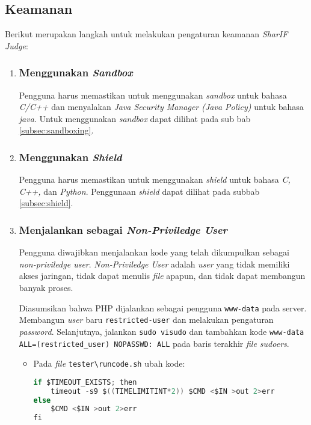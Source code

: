 \subsection{Keamanan}
Berikut merupakan langkah untuk melakukan pengaturan keamanan \textit{SharIF Judge}:
\begin{enumerate}
\item \subsubsection{Menggunakan \textit{Sandbox}}
Pengguna harus memastikan untuk menggunakan \textit{sandbox} untuk bahasa \textit{C/C++} dan menyalakan \textit{Java Security Manager (Java Policy)} untuk bahasa \textit{java}. Untuk menggunakan \textit{sandbox} dapat dilihat pada sub bab \ref{subsec:sandboxing}.

\item \subsubsection{Menggunakan \textit{Shield}}
Pengguna harus memastikan untuk menggunakan \textit{shield} untuk bahasa \textit{C, C++,} dan \textit{Python}. Penggunaan \textit{shield} dapat dilihat pada subbab \ref{subsec:shield}.

\item \subsubsection{Menjalankan sebagai \textit{Non-Priviledge User}}
Pengguna diwajibkan menjalankan kode yang telah dikumpulkan sebagai \textit{non-priviledge user}. \textit{Non-Priviledge User} adalah \textit{user} yang tidak memiliki akses jaringan, tidak dapat menulis \textit{file} apapun, dan tidak dapat membangun banyak proses.

Diasumsikan bahwa PHP dijalankan sebagai pengguna \verb|www-data| pada server. Membangun \textit{user} baru \verb|restricted-user| dan melakukan pengaturan \textit{password}. Selanjutnya, jalankan \verb|sudo visudo| dan tambahkan kode \verb|www-data ALL=(restricted_user) NOPASSWD: ALL| pada baris terakhir \textit{file sudoers}.
\begin{itemize}

\item Pada \textit{file} \verb|tester\runcode.sh| ubah kode:

\begin{lstlisting}[language=C,caption=Kode \textit{runcode.sh} awal, label=kode:runcodebefore]
if $TIMEOUT_EXISTS; then
	timeout -s9 $((TIMELIMITINT*2)) $CMD <$IN >out 2>err
else
	$CMD <$IN >out 2>err        
fi
\end{lstlisting}


\end{itemize}
\end{enumerate}
